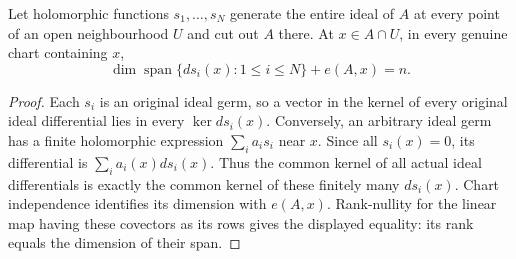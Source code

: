 \begin{lemma}
\label{hir:embedding-dimension-cartan-rank-nullity}
\leanok
Let holomorphic functions $s_1,\ldots,s_N$ generate the entire ideal of $A$
at every point of an open neighbourhood $U$ and cut out $A$ there. At
$x\in A\cap U$, in every genuine chart containing $x$,
\[
 \dim\operatorname{span}\{ds_i(x):1\le i\le N\}+e(A,x)=n.
\]
\end{lemma}
\begin{proof}
Each $s_i$ is an original ideal germ, so a vector in the kernel of every
original ideal differential lies in every $\ker ds_i(x)$. Conversely, an
arbitrary ideal germ has a finite holomorphic expression $\sum_i a_i s_i$
near $x$. Since all $s_i(x)=0$, its differential is $\sum_i a_i(x)ds_i(x)$.
Thus the common kernel of all actual ideal differentials is exactly the
common kernel of these finitely many $ds_i(x)$. Chart independence identifies
its dimension with $e(A,x)$. Rank-nullity for the linear map having these
covectors as its rows gives the displayed equality: its rank equals the
dimension of their span.
\end{proof}

